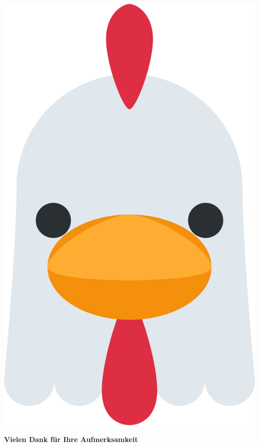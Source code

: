 \documentclass[aspectratio=169]{beamer}
\begin{document}
\begin{frame}
\begin{center}
\includegraphics[scale=4]{huhn}

\vspace*{30pt}
{\Huge \textbf{Vielen Dank für Ihre Aufmerksamkeit}}
\end{center}
\end{frame}

\end{document}
